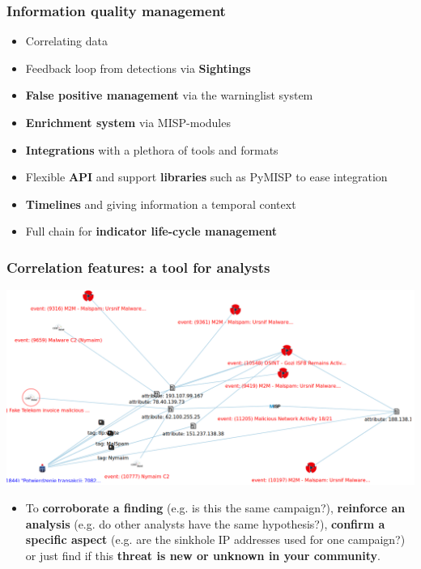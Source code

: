 \begin{frame}
\frametitle{Information quality management}
    \begin{itemize}
        \item Correlating data
        \item Feedback loop from detections via {\bf Sightings}
        \item {\bf False positive management} via the warninglist system
        \item {\bf Enrichment system} via MISP-modules
        \item {\bf Integrations} with a plethora of tools and formats
        \item Flexible {\bf API} and support {\bf libraries} such as PyMISP to ease integration
        \item {\bf Timelines} and giving information a temporal context
        \item Full chain for {\bf indicator life-cycle management}
    \end{itemize}
\end{frame}

\begin{frame}
        \frametitle{Correlation features: a tool for analysts}
        \includegraphics[scale=0.18]{screenshots/campaign.png}
        \begin{itemize}
                \item To {\bf corroborate a finding} (e.g. is this the same campaign?), {\bf reinforce an analysis} (e.g. do other analysts have the same hypothesis?), {\bf confirm a specific aspect} (e.g. are the sinkhole IP addresses used for one campaign?) or just find if this {\bf threat is new or unknown in your community}.
        \end{itemize}
\end{frame}

